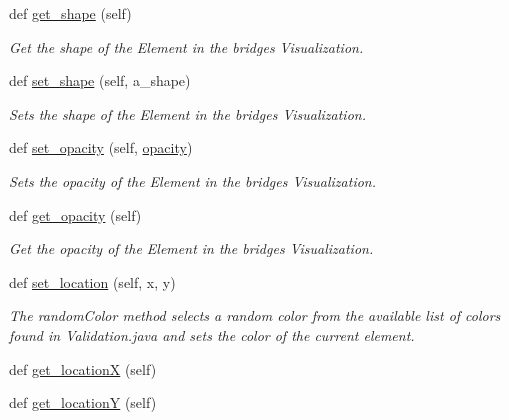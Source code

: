 \begin{DoxyCompactItemize}
def \hyperlink{class_bridges_1_1element__visualizer_1_1_element_visualizer_af897973bc87f21bb93149a820d6f32f5}{get\+\_\+shape} (self)
\begin{DoxyCompactList}\small\item\em Get the shape of the Element in the bridges Visualization. \end{DoxyCompactList}\item 
def \hyperlink{class_bridges_1_1element__visualizer_1_1_element_visualizer_a577c5842df4a7156bca91b19a8b1ccd5}{set\+\_\+shape} (self, a\+\_\+shape)
\begin{DoxyCompactList}\small\item\em Sets the shape of the Element in the bridges Visualization. \end{DoxyCompactList}\item 
def \hyperlink{class_bridges_1_1element__visualizer_1_1_element_visualizer_a16a1f22e7033c940d7b9cd5b4d0bc67c}{set\+\_\+opacity} (self, \hyperlink{class_bridges_1_1element__visualizer_1_1_element_visualizer_a8c32a4ec0b2de8d90dc9ba32a60d3d31}{opacity})
\begin{DoxyCompactList}\small\item\em Sets the opacity of the Element in the bridges Visualization. \end{DoxyCompactList}\item 
def \hyperlink{class_bridges_1_1element__visualizer_1_1_element_visualizer_a6976f47d3efbec8f7143ff865590c717}{get\+\_\+opacity} (self)
\begin{DoxyCompactList}\small\item\em Get the opacity of the Element in the bridges Visualization. \end{DoxyCompactList}\item 
def \hyperlink{class_bridges_1_1element__visualizer_1_1_element_visualizer_ad383e4865437f64afa039924658d49ba}{set\+\_\+location} (self, x, y)
\begin{DoxyCompactList}\small\item\em The random\+Color method selects a random color from the available list of colors found in Validation.\+java and sets the color of the current element. \end{DoxyCompactList}\item 
def \hyperlink{class_bridges_1_1element__visualizer_1_1_element_visualizer_a25986dc0ad3ec89dd8a933bd4ff782cc}{get\+\_\+location\+X} (self)
\item 
def \hyperlink{class_bridges_1_1element__visualizer_1_1_element_visualizer_a5edeca0b69cd6c4457148170058147f1}{get\+\_\+location\+Y} (self)
\end{DoxyCompactItemize}
